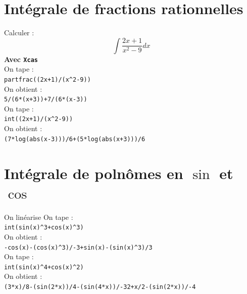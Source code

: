 \documentclass[a4paper,11pt]{book}
\begin{document}
\section{Int\'egrale de fractions rationnelles}
Calculer :\\
$$\int \frac{2x+1}{x^2-9}dx$$
{\bf Avec {\tt Xcas}}\\
On tape :\\
{\tt partfrac((2x+1)/(x\verb|^|2-9))}\\    
On obtient :\\
{\tt 5/(6*(x+3))+7/(6*(x-3))}\\
On tape :\\
{\tt int((2x+1)/(x\verb|^|2-9))}\\   
On obtient :\\
{\tt (7*log(abs(x-3)))/6+(5*log(abs(x+3)))/6}\\

\section{Int\'egrale de poln\^omes en $\sin$ et $\cos$}
On lin\'earise
\noindent On tape :\\
{\tt int(sin(x)\verb|^|3+cos(x)\verb|^|3)}\\   
On obtient :\\
{\tt -cos(x)-(cos(x)\verb|^|3)/-3+sin(x)-(sin(x)\verb|^|3)/3}\\
On tape :\\
{\tt int(sin(x)\verb|^|4+cos(x)\verb|^|2)}\\   
On obtient :\\
{\tt (3*x)/8-(sin(2*x))/4-(sin(4*x))/-32+x/2-(sin(2*x))/-4}\\
\end{document}
